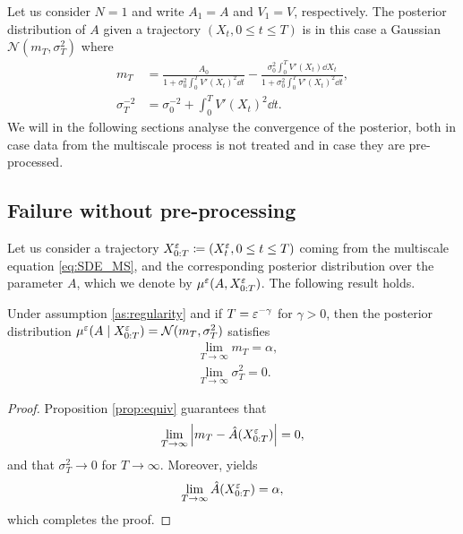 \documentclass[10pt]{article}
\begin{document}
Let us consider $N = 1$ and write $A_1 = A$ and $V_1 = V$, respectively. The posterior distribution of $A$ given a trajectory $(X_t, 0 \leq t \leq T)$ is in this case a Gaussian $\mathcal N(m_T, \sigma^2_T)$ where
\begin{equation}
\begin{aligned}
	m_T &= \frac{A_0}{1+\sigma_0^2\int_0^T V'(X_t)^2 \dd t} - \frac{\sigma_0^2\int_0^T  V'(X_t) \dd X_t}{1+\sigma_0^2\int_0^T V'(X_t)^2 \dd t}, \\
	\sigma^{-2}_T &= \sigma_0^{-2} + \int_0^T V'(X_t)^2 \dd t.
\end{aligned}
\end{equation}
We will in the following sections analyse the convergence of the posterior, both in case data from the multiscale process is not treated and in case they are pre-processed. 

\subsection{Failure without pre-processing}

Let us consider a trajectory $X_{0:T}^\varepsilon \coloneqq (X_t^\varepsilon, 0 \leq t \leq T)$ coming from the multiscale equation \eqref{eq:SDE_MS}, and the corresponding posterior distribution over the parameter $A$, which we denote by $\mu^\varepsilon(A, X_{0:T}^\varepsilon)$. The following result holds.
\begin{theorem} Under assumption \ref{as:regularity} and if $T = \varepsilon^{-\gamma}$ for $\gamma > 0$, then the posterior distribution $\mu^\varepsilon(A \mid X_{0:T}^\varepsilon) = \mathcal N(m_T,  \sigma^2_T)$ satisfies
	\begin{equation}
	\begin{aligned}
		&\lim_{T \to \infty} m_T = \alpha, \\
		&\lim_{T \to \infty} \sigma^2_T = 0.
	\end{aligned}
	\end{equation}
\end{theorem}
\begin{proof} Proposition \ref{prop:equiv} 	guarantees that 
	\begin{equation}
		\lim_{T \to \infty} \left\lvert m_T - \hat A(X^\varepsilon_{0:T})\right\rvert = 0,
	\end{equation}
	and that $\sigma^2_T \to 0$ for $T \to \infty$. Moreover, \cite[Theorem xx]{PaS07} yields
	\begin{equation}
		\lim_{T \to \infty} \hat A(X^\varepsilon_{0:T}) = \alpha,
	\end{equation}
	which completes the proof.
\end{proof}
\end{document}
